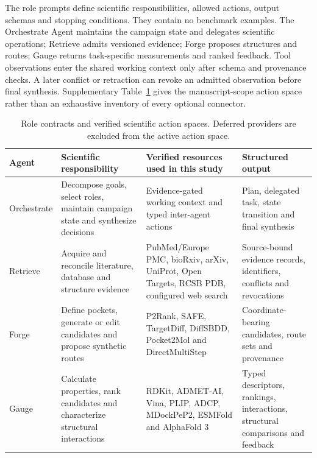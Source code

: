 \documentclass{article}
\begin{document}
The role prompts define scientific responsibilities, allowed actions, output schemas and stopping conditions. They contain no benchmark examples. The Orchestrate Agent maintains the campaign state and delegates scientific operations; Retrieve admits versioned evidence; Forge proposes structures and routes; Gauge returns task-specific measurements and ranked feedback. Tool observations enter the shared working context only after schema and provenance checks. A later conflict or retraction can revoke an admitted observation before final synthesis. Supplementary Table~\ref{tab:sup-agent-contracts} gives the manuscript-scope action space rather than an exhaustive inventory of every optional connector.

\begin{table}[htbp]
\centering
\small
\caption{Role contracts and verified scientific action spaces. Deferred providers are excluded from the active action space.}
\label{tab:sup-agent-contracts}
\begin{tabular}{lp{3.1cm}p{4.0cm}p{3.2cm}}
\toprule
Agent & Scientific responsibility & Verified resources used in this study & Structured output \\
\midrule
Orchestrate & Decompose goals, select roles, maintain campaign state and synthesize decisions & Evidence-gated working context and typed inter-agent actions & Plan, delegated task, state transition and final synthesis \\
Retrieve & Acquire and reconcile literature, database and structure evidence & PubMed/Europe PMC, bioRxiv, arXiv, UniProt, Open Targets, RCSB PDB, configured web search & Source-bound evidence records, identifiers, conflicts and revocations \\
Forge & Define pockets, generate or edit candidates and propose synthetic routes & P2Rank, SAFE, TargetDiff, DiffSBDD, Pocket2Mol and DirectMultiStep & Coordinate-bearing candidates, route sets and provenance \\
Gauge & Calculate properties, rank candidates and characterize structural interactions & RDKit, ADMET-AI, Vina, PLIP, ADCP, MDockPeP2, ESMFold and AlphaFold 3 & Typed descriptors, rankings, interactions, structural comparisons and feedback \\
\bottomrule
\end{tabular}
\end{table}
\end{document}
